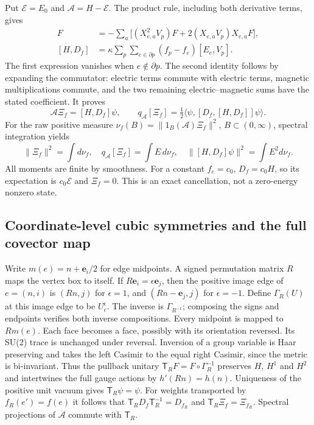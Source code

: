 Put $\mathcal E=E_0$ and $\mathcal A=H-\mathcal E$.
The product rule, including both derivative terms, gives
\begin{align}
 [E_e,V_p]F&=-\sum_a\bigl[(X_{e,a}^2V_p)F+
                           2(X_{e,a}V_p)X_{e,a}F\bigr],\label{eq:fabel-local-comm}\\
 [H,D_f]&=\kappa\sum_p\sum_{e\in\partial p}(f_p-f_e)[E_e,V_p].
 \label{eq:fabel-current-full}
\end{align}
The first expression vanishes when $e\notin\partial p$.
The second identity follows by expanding the commutator: electric terms
commute with electric terms, magnetic multiplications commute, and the
two remaining electric--magnetic sums have the stated coefficient.
It proves
\[
 \mathcal A\Xi_f=[H,D_f]\psi,\qquad
 q_{\mathcal A}[\Xi_f]=\tfrac12
 \langle\psi,[D_f,[H,D_f]]\psi\rangle .
\]
For the raw positive measure
$\nu_f(B)=\|1_B(\mathcal A)\Xi_f\|^2$, $B\subset(0,\infty)$, spectral
integration yields
\begin{equation}\label{eq:fabel-three-moments}
 \|\Xi_f\|^2=\int d\nu_f,\quad
 q_{\mathcal A}[\Xi_f]=\int E\,d\nu_f,\quad
 \|[H,D_f]\psi\|^2=\int E^2d\nu_f .
\end{equation}
All moments are finite by smoothness. For a constant $f_e=c_0$,
$D_f=c_0H$, so its expectation is $c_0\mathcal E$ and $\Xi_f=0$.
This is an exact cancellation, not a zero-energy nonzero state.

\subsection{Coordinate-level cubic symmetries and the full covector map}
Write $m(e)=n+\mathbf e_i/2$ for edge midpoints. A signed permutation
matrix $R$ maps the vertex box to itself. If $R\mathbf e_i=\epsilon\mathbf e_j$,
then the positive image edge of $e=(n,i)$ is $(Rn,j)$ for $\epsilon=1$,
and $(Rn-\mathbf e_j,j)$ for $\epsilon=-1$.
Define $\Gamma_R(U)$ at this image edge to be $U_e^\epsilon$.
The inverse is $\Gamma_{R^{-1}}$; composing the signs and endpoints
verifies both inverse compositions. Every midpoint is mapped to $Rm(e)$.
Each face becomes a face, possibly with its orientation reversed.
Its SU(2) trace is unchanged under reversal.
Inversion of a group variable is Haar preserving and takes the
left Casimir to the equal right Casimir, since the metric is bi-invariant.
Thus the pullback unitary
$\mathsf T_RF=F\circ\Gamma_R^{-1}$ preserves $H$, $H^1$ and $H^2$ and
intertwines the full gauge actions by $h'(Rn)=h(n)$.
Uniqueness of the positive unit vacuum gives $\mathsf T_R\psi=\psi$.
For weights transported by $f_R(e')=f(e)$ it follows that
$\mathsf T_RD_f\mathsf T_R^{-1}=D_{f_R}$ and
$\mathsf T_R\Xi_f=\Xi_{f_R}$. Spectral projections of $\mathcal A$ commute
with $\mathsf T_R$.

